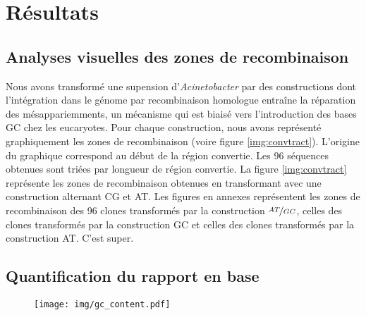 

\section{Résultats}
\label{sec:resultats}

\subsection{Analyses visuelles des zones de recombinaison}
\label{subsec:visu}

Nous avons transformé une supension d'\emph{Acinetobacter} par des constructions
dont l'intégration dans le génome par recombinaison homologue entraîne la
réparation des mésappariemments, un mécanisme qui est biaisé vers l'introduction
des bases GC chez les eucaryotes. Pour chaque construction, nous avons
représenté graphiquement les zones de recombinaison (voire figure
\ref{img:convtract}). L'origine du graphique correspond au début de la région
convertie. Les 96 séquences obtenues sont triées par longueur de région
convertie. La figure \ref{img:convtract} représente les zones de recombinaison
obtenues en transformant avec une construction alternant CG et AT. Les figures
en annexes
représentent les zones de recombinaison des 96 clones transformés par la
construction \(\nicefrac{AT}{GC}\), celles des clones transformés par la
construction GC et celles des clones transformés par la construction AT. C'est
super.

\subsection{Quantification du rapport en base}
\label{subsec:tauxgc}

\begin{figure}[ht]
  \centering
  \texttt{[image: img/gc\_content.pdf]}
  \caption{\label{fig:tauxgc} }
\end{figure}
